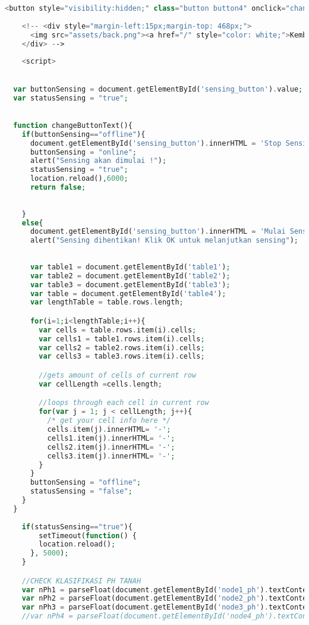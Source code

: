 \begin{lstlisting}[language=PHP, caption=skripsi\_sensing.blade.php]
    <button style="visibility:hidden;" class="button button4" onclick="changeButtonText()" value="online" id="sensing_button" style="margin-top: 140px;margin-right: 15px;">Pause Alert</button>
    
    <!-- <div style="margin-left:15px;margin-top: 468px;">
      <img src="assets/back.png"><a href="/" style="color: white;">Kembali</a>
    </div> -->
    
    <script>
 

  var buttonSensing = document.getElementById('sensing_button').value;
  var statusSensing = "true";
  

  function changeButtonText(){
    if(buttonSensing=="offline"){ 
      document.getElementById('sensing_button').innerHTML = 'Stop Sensing';
      buttonSensing = "online";
      alert("Sensing akan dimulai !");
      statusSensing = "true";
      location.reload(),6000;
      return false;
      
      
    }
    else{ 
      document.getElementById('sensing_button').innerHTML = 'Mulai Sensing';
      alert("Sensing dihentikan! Klik OK untuk melanjutkan sensing");
      
      
      var table1 = document.getElementById('table1');
      var table2 = document.getElementById('table2');
      var table3 = document.getElementById('table3');
      var table = document.getElementById('table4');
      var lengthTable = table.rows.length;

      for(i=1;i<lengthTable;i++){
        var cells = table.rows.item(i).cells;
        var cells1 = table1.rows.item(i).cells;
        var cells2 = table2.rows.item(i).cells;
        var cells3 = table3.rows.item(i).cells;

        //gets amount of cells of current row
        var cellLength =cells.length;

        //loops through each cell in current row
        for(var j = 1; j < cellLength; j++){
          /* get your cell info here */
          cells.item(j).innerHTML= '-';
          cells1.item(j).innerHTML= '-';
          cells2.item(j).innerHTML= '-';
          cells3.item(j).innerHTML= '-';
        }
      }
      buttonSensing = "offline";
      statusSensing = "false";
    }
  }
  
    if(statusSensing=="true"){
        setTimeout(function() {
        location.reload();
      }, 5000);
    }

    //CHECK KLASIFIKASI PH TANAH
    var nPh1 = parseFloat(document.getElementById('node1_ph').textContent);
    var nPh2 = parseFloat(document.getElementById('node2_ph').textContent);
    var nPh3 = parseFloat(document.getElementById('node3_ph').textContent);
    //var nPh4 = parseFloat(document.getElementById('node4_ph').textContent);


\end{lstlisting}
